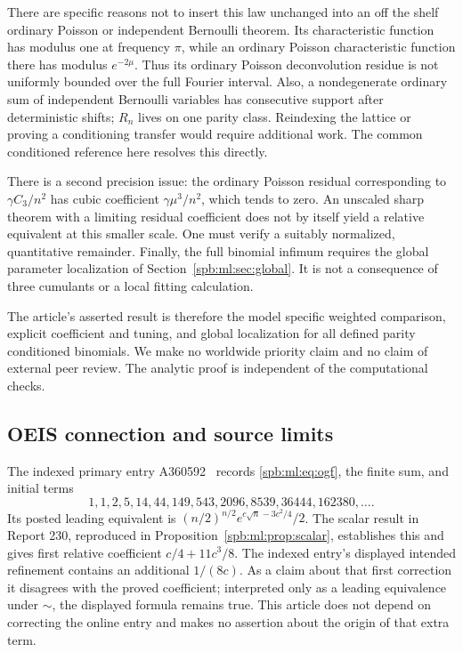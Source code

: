 There are specific reasons not to insert this law unchanged into an off the shelf ordinary Poisson or independent Bernoulli theorem. Its characteristic function has modulus one at frequency $\pi$, while an ordinary Poisson characteristic function there has modulus $e^{-2\mu}$. Thus its ordinary Poisson deconvolution residue is not uniformly bounded over the full Fourier interval. Also, a nondegenerate ordinary sum of independent Bernoulli variables has consecutive support after deterministic shifts; $R_n$ lives on one parity class. Reindexing the lattice or proving a conditioning transfer would require additional work. The common conditioned reference here resolves this directly.

There is a second precision issue: the ordinary Poisson residual corresponding to $\gamma C_3/n^2$ has cubic coefficient $\gamma\mu^3/n^2$, which tends to zero. An unscaled sharp theorem with a limiting residual coefficient does not by itself yield a relative equivalent at this smaller scale. One must verify a suitably normalized, quantitative remainder. Finally, the full binomial infimum requires the global parameter localization of Section~\ref{spb:ml:sec:global}. It is not a consequence of three cumulants or a local fitting calculation.

The article's asserted result is therefore the model specific weighted comparison, explicit coefficient and tuning, and global localization for all defined parity conditioned binomials. We make no worldwide priority claim and no claim of external peer review. The analytic proof is independent of the computational checks.

\subsection{OEIS connection and source limits}
The indexed primary entry A360592~\cite{oeis1} records \eqref{spb:ml:eq:ogf}, the finite sum, and initial terms
\[
 1,1,2,5,14,44,149,543,2096,8539,36444,162380,\ldots.
\]
Its posted leading equivalent is $(n/2)^{n/2}e^{c\sqrt n-3c^2/4}/2$. The scalar result in Report 230, reproduced in Proposition~\ref{spb:ml:prop:scalar}, establishes this and gives first relative coefficient $c/4+11c^3/8$. The indexed entry's displayed intended refinement contains an additional $1/(8c)$. As a claim about that first correction it disagrees with the proved coefficient; interpreted only as a leading equivalence under $\sim$, the displayed formula remains true. This article does not depend on correcting the online entry and makes no assertion about the origin of that extra term.


